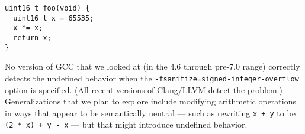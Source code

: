 {\scriptsize
\begin{verbatim}
uint16_t foo(void) {
  uint16_t x = 65535;
  x *= x;
  return x;
}
\end{verbatim}
}
No version of GCC that we looked at (in the 4.6 through pre-7.0 range)
correctly detects the undefined behavior when the
\texttt{-fsanitize=signed-integer-overflow} option is specified.
%
(All recent versions of Clang/LLVM detect the problem.)
%
Generalizations that we plan to explore include modifying arithmetic
operations in ways that appear to be semantically neutral --- such as
rewriting \texttt{x + y} to be \texttt{(2 * x) + y - x} --- but that
might introduce undefined behavior.
